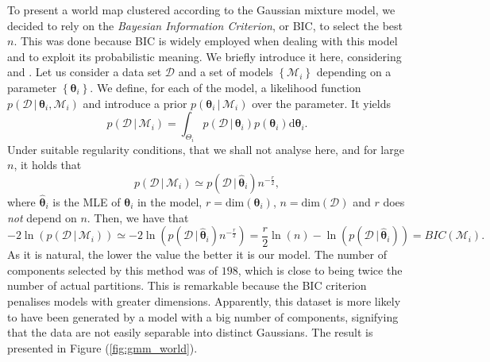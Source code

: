 \documentclass[a4paper]{article}
\begin{document}
 	To present a world map clustered according to the Gaussian mixture model, we decided to rely on the \textit{Bayesian Information Criterion}, or BIC, to select the best $n$. This was done because BIC is widely employed when dealing with this model and to exploit its probabilistic meaning. We briefly introduce it here, considering \cite{Bishop:2006} and \cite{Schwarz_1978}.
 	Let us consider a data set $\mathcal{D}$ and a set of models $\left\{\mathcal{M}_{i}\right\}$ depending on a parameter $\left\{\boldsymbol{\theta}_{i}\right\}$. We define, for each of the model, a likelihood function $p \left(\mathcal{D}\,|\,\boldsymbol{\theta}_{i}, \mathcal{M}_{i}\right)$ and introduce a prior $p \left( \boldsymbol{\theta}_{i} \,|\, \mathcal{M}_{i} \right) $ over the parameter. It yields
 	\begin{equation*}
 	p\left(\mathcal{D} \,|\, \mathcal{M}_{i} \right) = \int_{\Theta_{i}} p \left (\mathcal{D} \,|\, \boldsymbol{\theta}_{i}\right) p \left( \boldsymbol{\theta}_{i} \right) \mathrm{d}\boldsymbol{\theta}_{i}.
 	\end{equation*}
 	Under suitable regularity conditions, that we shall not analyse here, and for large $n$, it holds that
 	\begin{equation*}
 	p\left(\mathcal{D} \,|\, \mathcal{M}_{i} \right) \simeq p \left( \mathcal{D} \,|\, \hat{\boldsymbol{\theta}}_{i} \right) n^{-\frac{r}{2}},
 	\end{equation*}
 	where $\hat{\boldsymbol{\theta}}_{i}$ is the MLE of $\boldsymbol{\theta}_{i}$ in the model, $r = \mathrm{dim} (\boldsymbol{\theta}_{i})$, $n = \mathrm{dim} \left( \mathcal{D} \right)$ and $r$ does \textit{not} depend on $n$.
 	Then, we have that 
 	\begin{equation*}
 	-2\ln \left( 	p\left(\mathcal{D} \,|\, \mathcal{M}_{i} \right) \right) \simeq -2 \ln \left(  p \left( \mathcal{D} \,|\, \hat{\boldsymbol{\theta}}_{i} \right) n^{-\frac{r}{2}} \right) = \frac{r}{2} \ln (n) - \ln \left( p \left( \mathcal{D} \,|\, \hat{\boldsymbol{\theta}}_{i} \right) \right) = BIC\left( \mathcal{M}_{i} \right).
 	\end{equation*}
 	As it is natural, the lower the value the better it is our model.
 	The number of components selected by this method was of $198$, which is close to being twice the number of actual partitions. This is remarkable because the BIC criterion penalises models with greater dimensions. Apparently, this dataset is more likely to have been generated by a model with a big number of components, signifying that the data are not easily separable into distinct Gaussians.
 	The result is presented in Figure (\ref{fig:gmm_world}).
 	
\end{document}

